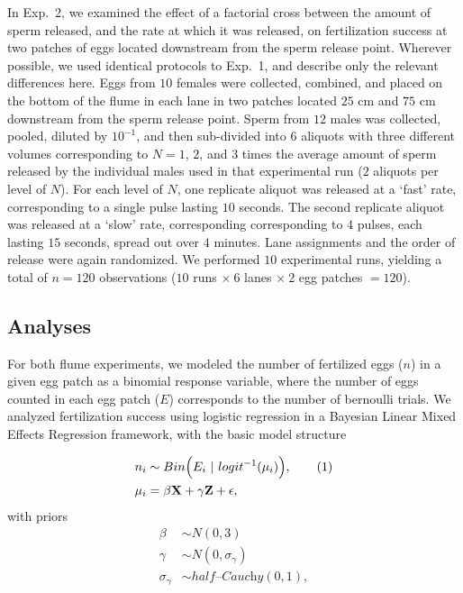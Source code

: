 \documentclass{article}
\newcommand\numberthis{\addtocounter{equation}{1}\tag{\theequation}}
\begin{document}
	In Exp.~2, we examined the effect of a factorial cross between the amount of sperm released, and the rate at which it was released, on fertilization success at two patches of eggs located downstream from the sperm release point. Wherever possible, we used identical protocols to Exp.~1, and describe only the relevant differences here. Eggs from $10$ females were collected, combined, and placed on the bottom of the flume in each lane in two patches located $25$ cm and $75$ cm downstream from the sperm release point. Sperm from $12$ males was collected, pooled, diluted by $10^{-1}$, and then sub-divided into $6$ aliquots with three different volumes corresponding to $N = 1$, $2$, and $3$ times the average amount of sperm released by the individual males used in that experimental run ($2$ aliquots per level of $N$). For each level of $N$, one replicate aliquot was released at a `fast' rate, corresponding to a single pulse lasting $10$ seconds. The second replicate aliquot was released at a `slow' rate, corresponding corresponding to $4$ pulses, each lasting $15$ seconds, spread out over $4$ minutes. Lane assignments and the order of release were again randomized. We performed $10$ experimental runs, yielding a total of $n=120$ observations ($10$ runs $\times~6$ lanes $\times~2$ egg patches $= 120$).

	\subsection*{Analyses}
	For both flume experiments, we modeled the number of fertilized eggs ($n$) in a given egg patch as a binomial response variable, where the number of eggs counted in each egg patch ($E$) corresponds to the number of bernoulli trials. We analyzed fertilization success using logistic regression in a Bayesian Linear Mixed Effects Regression framework, with the basic model structure 

\begin{align*}
	n_i   &\sim Bin\Big(E_i~|~logit^{-1}(\mu_i)\Big), \numberthis\\
	\mu_i &= \beta \mathbf{X} + \gamma \mathbf{Z} + \epsilon,
\end{align*}
\noindent{} with priors
\begin{align*}
	\beta           &\sim N(0,3) \\
	\gamma          &\sim N(0,\sigma_{\gamma}) \\
	\sigma_{\gamma} &\sim \mathit{half} \text{--}\textit{Cauchy}(0,1),
\end{align*}
\end{document}
